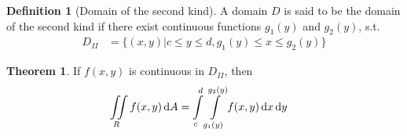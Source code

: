 \documentclass[fleqn, a4paper, 12pt]{article}
\theoremstyle{definition}
\newtheorem{definition}{Definition}
\theoremstyle{theorem}
\newtheorem{theorem}{Theorem}
\theoremstyle{remark}
\begin{document}
\begin{definition}[Domain of the second kind]
	A domain $D$ is said to be the domain of the second kind if there exist continuous functions $g_1(y)$ and $g_2(y)$, s.t.
	\begin{align*}
	D_{II} &= \{(x,y) | c \leq y \leq d, g_1(y) \leq x \leq g_2(y)\}
	\end{align*}
\end{definition}

\begin{theorem}
	If $f(x,y)$ is continuous in $D_{II}$, then
	\begin{align*}
		\iint\limits_{R} f(x,y) \dif A &= \int\limits_{c}^{d} \int\limits_{g_1(y)}^{g_2(y)} f(x,y) \dif x \dif y
	\end{align*}
\end{theorem}
\end{document}
